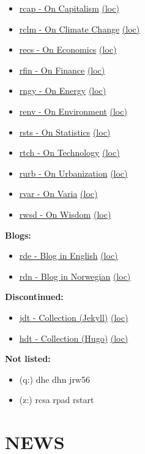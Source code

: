 \documentclass[
]{book}
\providecommand{\tightlist}{%
  \setlength{\itemsep}{0pt}\setlength{\parskip}{0pt}}
\begin{document}
\begin{itemize}
\tightlist
\item
  \href{https://dyrehaugen.github.io/rcap}{rcap - On Capitalism} \href{http://localhost/rcap}{(loc)}
\item
  \href{https://dyrehaugen.github.io/rclm}{rclm - On Climate Change} \href{http://localhost/rclm}{(loc)}
\item
  \href{https://dyrehaugen.github.io/recs}{recs - On Economics} \href{http://localhost/recs}{(loc)}
\item
  \href{https://dyrehaugen.github.io/rngy}{rfin - On Finance} \href{http://localhost/rfin}{(loc)}
\item
  \href{https://dyrehaugen.github.io/rngy}{rngy - On Energy} \href{http://localhost/rngy}{(loc)}
\item
  \href{https://dyrehaugen.github.io/renv}{renv - On Environment} \href{http://localhost/renv}{(loc)}
\item
  \href{https://dyrehaugen.github.io/rsts}{rsts - On Statistics} \href{http://localhost/rsts}{(loc)}
\item
  \href{https://dyrehaugen.github.io/rtch}{rtch - On Technology} \href{http://localhost/rtch}{(loc)}
\item
  \href{https://dyrehaugen.github.io/rurb}{rurb - On Urbanization} \href{http://localhost/rurb}{(loc)}
\item
  \href{https://dyrehaugen.github.io/rvar}{rvar - On Varia} \href{http://localhost/rvar}{(loc)}
\item
  \href{https://dyrehaugen.github.io/rwsd}{rwsd - On Wisdom} \href{http://localhost/rwsd}{(loc)}
\end{itemize}

\textbf{Blogs:}

\begin{itemize}
\tightlist
\item
  \href{https://dyrehaugen.github.io/rde}{rde - Blog in English} \href{http://localhost/rde}{(loc)}
\item
  \href{https://dyrehaugen.github.io/rdn}{rdn - Blog in Norwegian} \href{http://localhost/rdn}{(loc)}
\end{itemize}

\textbf{Discontinued:}

\begin{itemize}
\tightlist
\item
  \href{https://dyrehaugen.github.io/jdt}{jdt - Collection (Jekyll)} \href{http://localhost/jdt}{(loc)}
\item
  \href{https://dyrehaugen.github.io/hdt}{hdt - Collection (Hugo)} \href{http://localhost/hdt}{(loc)}
\end{itemize}

\textbf{Not listed:}

\begin{itemize}
\tightlist
\item
  (q:) dhe dhn jrw56
\item
  (z:) rcsa rpad rstart
\end{itemize}

\hypertarget{news}{%
\chapter{NEWS}\label{news}}

  
\end{document}
